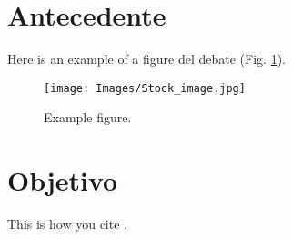 \section{Antecedente}

Here is an example of a figure del debate (Fig. \ref{fig:example}).\\

 \begin{figure}[!ht]
    \centering
    \texttt{[image: Images/Stock\_image.jpg]}
    \caption{Example figure.}
    \label{fig:example}
\end{figure}


\section{Objetivo}
This is how you cite \cite{savitzky,Harvey2002}.\\



